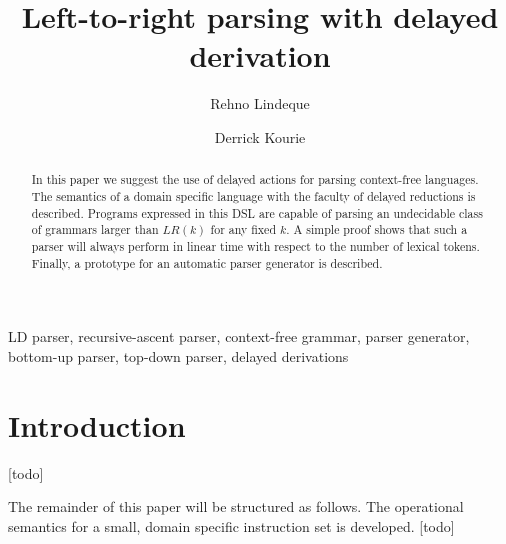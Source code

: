 \documentclass[envcountsame,runningheads]{llncs}
\begin{document}
\title{Left-to-right parsing with delayed derivation}
\author{Rehno Lindeque \and Derrick Kourie}
\maketitle

\begin{abstract}
In this paper we suggest the use of delayed actions for parsing context-free languages.
The semantics of a domain specific language with the faculty of delayed reductions is described.
Programs expressed in this DSL are capable of parsing an undecidable class of grammars larger than $LR(k)$ for any fixed $k$.
A simple proof shows that such a parser will always perform in linear time with respect to the number of lexical tokens.
Finally, a prototype for an automatic parser generator is described.
\end{abstract}

\begin{keywords}
LD parser, recursive-ascent parser, context-free grammar, parser generator, bottom-up parser, top-down parser, delayed derivations
\end{keywords}

\section{Introduction}

[todo]

The remainder of this paper will be structured as follows. 
The operational semantics for a small, domain specific instruction set is developed.
[todo]


%

\end{document}

